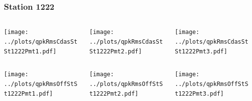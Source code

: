 \documentclass[aspectratio=169]{beamer}
\begin{document}
\begin{frame} 
  \frametitle{Station 1222}
  \begin{center}
    \begin{columns}
      \begin{column}{0.33\textwidth}
        \texttt{[image: ../plots/qpkRmsCdasStSt1222Pmt1.pdf]}
      \end{column}
      \begin{column}{0.33\textwidth}
        \texttt{[image: ../plots/qpkRmsCdasStSt1222Pmt2.pdf]}
      \end{column}
      \begin{column}{0.33\textwidth}
        \texttt{[image: ../plots/qpkRmsCdasStSt1222Pmt3.pdf]}
      \end{column}
    \end{columns}
  \end{center}

  \begin{center}
    \begin{columns}
      \begin{column}{0.33\textwidth}
        \texttt{[image: ../plots/qpkRmsOffStSt1222Pmt1.pdf]}
      \end{column}
      \begin{column}{0.33\textwidth}
        \texttt{[image: ../plots/qpkRmsOffStSt1222Pmt2.pdf]}
      \end{column}
      \begin{column}{0.33\textwidth}
        \texttt{[image: ../plots/qpkRmsOffStSt1222Pmt3.pdf]}
      \end{column}
    \end{columns}
  \end{center}
\end{frame}
\end{document}
